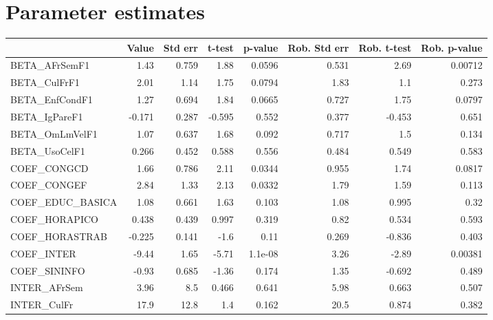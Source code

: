 \section{Parameter estimates}
\begin{tabular}{lrrrrrrr}
\toprule
{} &  Value &  Std err &  t-test &  p-value &  Rob. Std err &  Rob. t-test &  Rob. p-value \\
\midrule
BETA\_AFrSemF1      &   1.43 &    0.759 &    1.88 &   0.0596 &         0.531 &         2.69 &       0.00712 \\
BETA\_CulFrF1       &   2.01 &     1.14 &    1.75 &   0.0794 &          1.83 &          1.1 &         0.273 \\
BETA\_EnfCondF1     &   1.27 &    0.694 &    1.84 &   0.0665 &         0.727 &         1.75 &        0.0797 \\
BETA\_IgPareF1      & -0.171 &    0.287 &  -0.595 &    0.552 &         0.377 &       -0.453 &         0.651 \\
BETA\_OmLmVelF1     &   1.07 &    0.637 &    1.68 &    0.092 &         0.717 &          1.5 &         0.134 \\
BETA\_UsoCelF1      &  0.266 &    0.452 &   0.588 &    0.556 &         0.484 &        0.549 &         0.583 \\
COEF\_CONGCD        &   1.66 &    0.786 &    2.11 &   0.0344 &         0.955 &         1.74 &        0.0817 \\
COEF\_CONGEF        &   2.84 &     1.33 &    2.13 &   0.0332 &          1.79 &         1.59 &         0.113 \\
COEF\_EDUC\_BASICA   &   1.08 &    0.661 &    1.63 &    0.103 &          1.08 &        0.995 &          0.32 \\
COEF\_HORAPICO      &  0.438 &    0.439 &   0.997 &    0.319 &          0.82 &        0.534 &         0.593 \\
COEF\_HORASTRAB     & -0.225 &    0.141 &    -1.6 &     0.11 &         0.269 &       -0.836 &         0.403 \\
COEF\_INTER         &  -9.44 &     1.65 &   -5.71 &  1.1e-08 &          3.26 &        -2.89 &       0.00381 \\
COEF\_SININFO       &  -0.93 &    0.685 &   -1.36 &    0.174 &          1.35 &       -0.692 &         0.489 \\
INTER\_AFrSem       &   3.96 &      8.5 &   0.466 &    0.641 &          5.98 &        0.663 &         0.507 \\
INTER\_CulFr        &   17.9 &     12.8 &     1.4 &    0.162 &          20.5 &        0.874 &         0.382 \\

\end{tabular}
